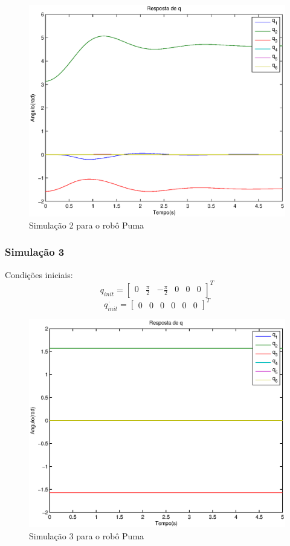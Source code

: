 \documentclass{article}
\begin{document}
\begin{figure}[H]
	\centering
	\includegraphics[width=0.8\linewidth]{../sim2ode}
	\caption{Simulação 2 para o robô Puma}
	\label{fig:pumasim2}
\end{figure}

\subsubsection{Simulação 3}
Condições iniciais:
\begin{equation}
\label{eq:sim3q}
q_{init}=\begin{bmatrix}
0 & \frac{\pi}{2} & -\frac{\pi}{2} & 0 & 0 & 0
\end{bmatrix}^T
\end{equation}
\begin{equation}
\label{eq:sim3qd}
\dot{q_{init}}=\begin{bmatrix}
0 & 0 & 0 & 0 & 0 & 0
\end{bmatrix}^T
\end{equation}

\begin{figure}[H]
	\centering
	\includegraphics[width=0.8\linewidth]{../sim3ode}
	\caption{Simulação 3 para o robô Puma}
	\label{fig:pumasim3}
\end{figure}
\end{document}
